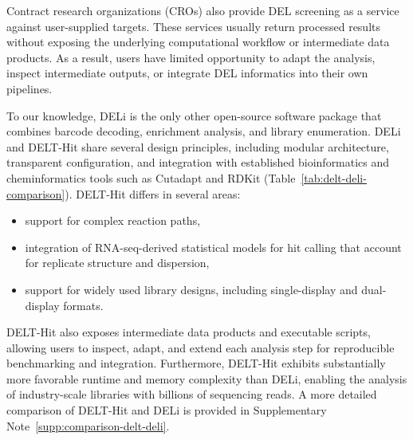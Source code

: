 Contract research organizations (CROs) also provide DEL screening as a service against user-supplied targets. These services usually return processed results without exposing the underlying computational workflow or intermediate data products. As a result, users have limited opportunity to adapt the analysis, inspect intermediate outputs, or integrate DEL informatics into their own pipelines.

To our knowledge, DELi\cite{wellnitz_opensourcednaencodedlibrary_2025} is the only other open-source software package that combines barcode decoding, enrichment analysis, and library enumeration. DELi and DELT-Hit share several design principles, including modular architecture, transparent configuration, and integration with established bioinformatics and cheminformatics tools such as Cutadapt and RDKit (Table~\ref{tab:delt-deli-comparison}). DELT-Hit differs in several areas:

\begin{itemize}
  \item support for complex reaction paths,
  \item integration of RNA-seq-derived statistical models for hit calling that account for replicate structure and dispersion,
  \item support for widely used library designs, including single-display and dual-display formats.
\end{itemize}

DELT-Hit also exposes intermediate data products and executable scripts, allowing users to inspect, adapt, and extend each analysis step for reproducible benchmarking and integration. Furthermore, DELT-Hit exhibits substantially more favorable runtime and memory complexity than DELi, enabling the analysis of industry-scale libraries with billions of sequencing reads. A more detailed comparison of DELT-Hit and DELi is provided in Supplementary Note~\ref{supp:comparison-delt-deli}.
